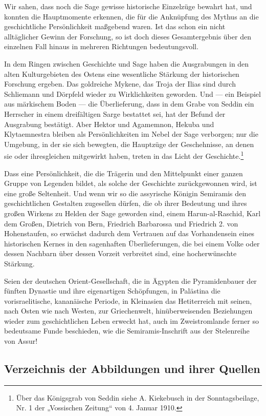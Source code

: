 \documentclass[a4paper, 11pt, oneside, polutonikogreek, german]{article}
\begin{document}
Wir sahen, dass noch die Sage gewisse historische Einzelzüge bewahrt hat, und konnten die Hauptmomente erkennen, die für die Anknüpfung des Mythus an die geschichtliche Persönlichkeit maßgebend waren. Ist das schon ein nicht alltäglicher Gewinn der Forschung, so ist doch dieses Gesamtergebnis über den einzelnen Fall hinaus in mehreren Richtungen bedeutungsvoll.

In dem Ringen zwischen Geschichte und Sage haben die Ausgrabungen in den alten Kulturgebieten des Ostens eine wesentliche Stärkung der historischen Forschung ergeben. Das goldreiche Mykene, das Troja der Ilias sind durch Schliemann und Dörpfeld wieder zu Wirklichkeiten geworden. Und --- ein Beispiel aus märkischem Boden --- die Überlieferung, dass in dem Grabe von Seddin ein Herrscher in einem dreifältigen Sarge bestattet sei, hat der Befund der Ausgrabung bestätigt. Aber Hektor und Agamemnon, Hekuba und Klytaemnestra bleiben als Persönlichkeiten im Nebel der Sage verborgen; nur die Umgebung, in der sie sich bewegten, die Hauptzüge der Geschehnisse, an denen sie oder ihresgleichen mitgewirkt haben, treten in das Licht der Geschichte.\footnote{Über das Königsgrab von Seddin siehe A. Kiekebusch in der Sonntagsbeilage, Nr. 1 der „Vossischen Zeitung“ von 4. Januar 1910.}

Dass eine Persönlichkeit, die die Trägerin und den Mittelpunkt einer ganzen Gruppe von Legenden bildet, als solche der Geschichte zurückgewonnen wird, ist eine große Seltenheit. Und wenn wir so die assyrische Königin Semiramis den geschichtlichen Gestalten zugesellen dürfen, die ob ihrer Bedeutung und ihres großen Wirkens zu Helden der Sage geworden sind, einem Harun-al-Raschid, Karl dem Großen, Dietrich von Bern, Friedrich Barbarossa und Friedrich 2. von Hohenstaufen, so erwächst dadurch dem Vertrauen auf das Vorhandensein eines historischen Kernes in den sagenhaften Überlieferungen, die bei einem Volke oder dessen Nachbarn über dessen Vorzeit verbreitet sind, eine hocherwünschte Stärkung.

Seien der deutschen Orient-Gesellschaft, die in Ägypten die Pyramidenbauer der fünften Dynastie und ihre eigenartigen Schöpfungen, in Palästina die vorisraelitische, kananäische Periode, in Kleinasien das Hetiterreich mit seinen, nach Osten wie nach Westen, zur Griechenwelt, hinüberweisenden Beziehungen wieder zum geschichtlichen Leben erweckt hat, auch im Zweistromlande ferner so bedeutsame Funde beschieden, wie die Semiramis-Inschrift aus der Stelenreihe von Assur!
\clearpage
\subsection*{Verzeichnis der Abbildungen und ihrer Quellen}
\end{document}
